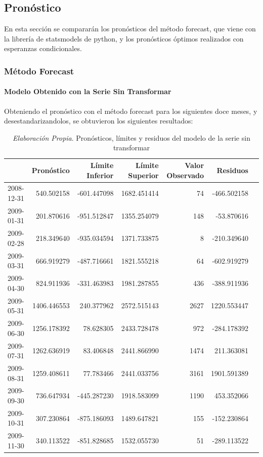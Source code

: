 \documentclass[12pt,letterpaper]{article}   %
\begin{document}
\newpage
\subsection{Pronóstico}
En esta sección se compararán los pronósticos del método forecast, que viene con la librería de statsmodels de python, y los pronósticos óptimos realizados con esperanzas condicionales.


  \subsubsection{Método Forecast}
  
  \paragraph{Modelo Obtenido con la Serie Sin Transformar}
Obteniendo el pronóstico con el método forecast para los siguientes doce meses, y desestandarizandolos, se obtuvieron los siguientes resultados: 

    \begin{table}[ht]
\centering
\footnotesize
\begin{tabular}{lrrrrrr}
\toprule
 & \textbf{Pronóstico} & \textbf{Límite Inferior} & \textbf{Límite Superior} & \textbf{Valor Observado} & \textbf{Residuos} \\
\midrule
2008-12-31 & 540.502158 & -601.447098 & 1682.451414 & 74 & -466.502158 \\
2009-01-31 & 201.870616 & -951.512847 & 1355.254079 & 148 & -53.870616 \\
2009-02-28 & 218.349640 & -935.034594 & 1371.733875 & 8 & -210.349640 \\
2009-03-31 & 666.919279 & -487.716661 & 1821.555218 & 64 & -602.919279 \\
2009-04-30 & 824.911936 & -331.463983 & 1981.287855 & 436 & -388.911936 \\
2009-05-31 & 1406.446553 & 240.377962 & 2572.515143 & 2627 & 1220.553447 \\
2009-06-30 & 1256.178392 & 78.628305 & 2433.728478 & 972 & -284.178392 \\
2009-07-31 & 1262.636919 & 83.406848 & 2441.866990 & 1474 & 211.363081 \\
2009-08-31 & 1259.408611 & 77.783466 & 2441.033756 & 3161 & 1901.591389 \\
2009-09-30 & 736.647934 & -445.287230 & 1918.583099 & 1190 & 453.352066 \\
2009-10-31 & 307.230864 & -875.186093 & 1489.647821 & 155 & -152.230864 \\
2009-11-30 & 340.113522 & -851.828685 & 1532.055730 & 51 & -289.113522 \\
\bottomrule
\end{tabular}
\caption{\textit{Elaboración Propia}. Pronósticos, límites y residuos del modelo de la serie sin transformar}
\end{table}
\end{document}
